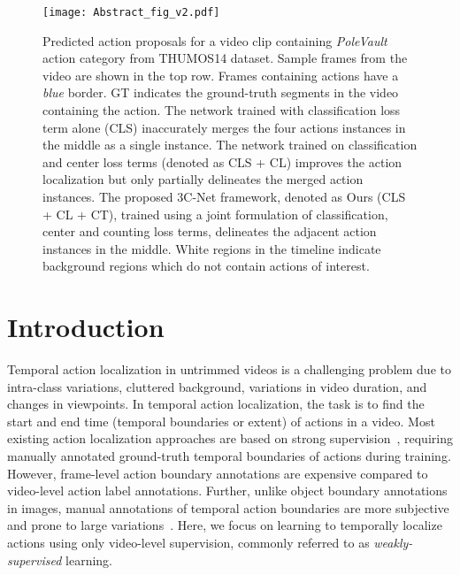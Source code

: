 \documentclass[10pt,twocolumn,letterpaper]{article}
\begin{document}
\begin{figure*}[t]
    \centering
    \texttt{[image: Abstract\_fig\_v2.pdf]}
    \caption{Predicted action proposals for a video clip containing \emph{PoleVault} action category from THUMOS14 dataset. Sample frames from the video are shown in the top row. Frames containing actions have a \emph{blue} border. GT indicates the ground-truth segments in the video containing the action. The network trained with classification loss term alone (CLS) inaccurately merges the four actions instances in the middle as a single instance. The network trained on classification and center loss terms (denoted as CLS + CL) improves the action localization but only partially delineates the merged action instances. The proposed 3C-Net framework, denoted as Ours (CLS + CL + CT), trained using a joint formulation of classification, center and counting loss terms, delineates the adjacent action instances in the middle. White regions in the timeline indicate background regions which do not contain actions of interest.}
    \label{fig_intro}\vspace{-0.22cm}
\end{figure*}

\section{Introduction}
Temporal action localization in untrimmed videos is a challenging problem due to intra-class variations, cluttered background, variations in video duration, and changes in viewpoints. In temporal action localization, the task is to find the start and end time (temporal boundaries or extent) of actions in a video. Most existing action localization approaches are based on strong supervision~\cite{fv-dtf,talnet,cdc,ssn,scnn,rc3d}, requiring manually annotated ground-truth temporal boundaries of actions during training. However, frame-level action boundary annotations are expensive compared to video-level action label annotations. Further, unlike object boundary annotations in images, manual annotations of temporal action boundaries are more subjective and prone to large variations~\cite{action-snippet,action-extent}.
Here, we focus on learning to temporally localize actions using only video-level supervision, commonly referred to as \emph{weakly-supervised} learning.
\end{document}
